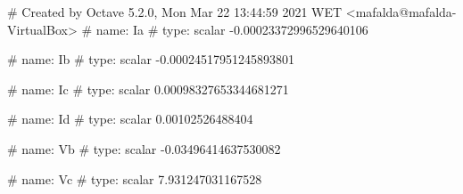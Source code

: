 # Created by Octave 5.2.0, Mon Mar 22 13:44:59 2021 WET <mafalda@mafalda-VirtualBox>
# name: Ia
# type: scalar
-0.00023372996529640106


# name: Ib
# type: scalar
-0.00024517951245893801


# name: Ic
# type: scalar
0.00098327653344681271


# name: Id
# type: scalar
0.00102526488404


# name: Vb
# type: scalar
-0.03496414637530082


# name: Vc
# type: scalar
7.931247031167528


